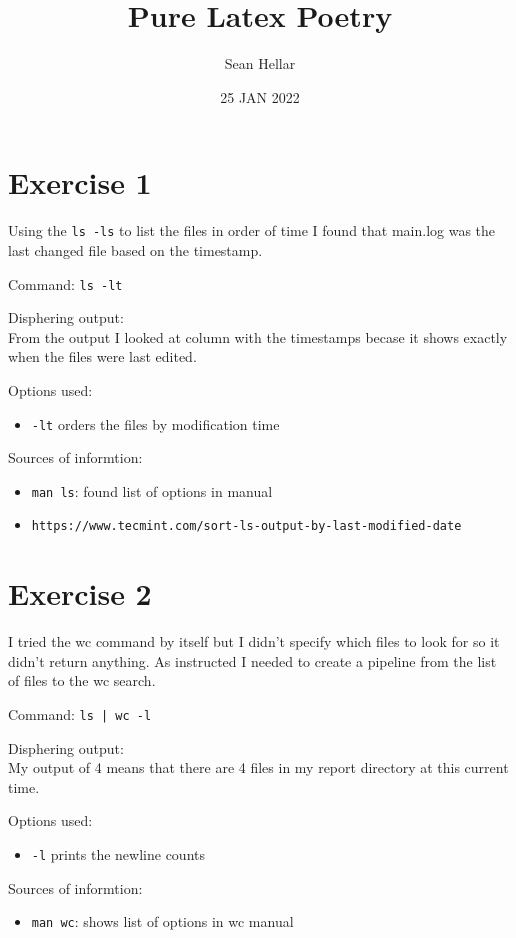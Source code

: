 \documentclass{article}
\title{Pure Latex Poetry}
\date{25 JAN 2022}
\author{Sean Hellar}
\begin{document}
\maketitle
\newpage

\section{Exercise 1}
Using the \texttt{ls -ls} to list the files in order of time I found that main.log was the last changed file based on the timestamp. 

Command: \texttt{ls -lt}

Disphering output:\\
From the output I looked at column with the timestamps becase it shows exactly when the files were last edited.

Options used:
\begin{itemize}
    \item{\texttt{-lt} orders the files by modification time}
\end{itemize}

Sources of informtion:
\begin{itemize}
    \item{\texttt{man ls}: found list of options in manual}
    \item{\texttt{https://www.tecmint.com/sort-ls-output-by-last-modified-date}}
\end{itemize}


\newpage
\section{Exercise 2}
I tried the wc command by itself but I didn't specify which files to look for so it didn't return anything. As instructed I needed to create a pipeline from the list of files to the wc search. 

Command: \texttt{ls | wc -l}

Disphering output:\\
My output of 4 means that there are 4 files in my report directory at this current time. 

Options used:
\begin{itemize}
    \item{\texttt{-l} prints the newline counts }
\end{itemize}

Sources of informtion:
\begin{itemize}
    \item{\texttt{man wc}: shows list of options in wc manual}
\end{itemize}
\end{document}
